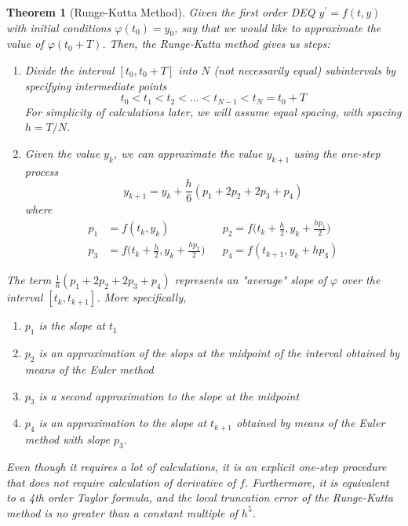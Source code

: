 \documentclass{article}
\newtheorem{theorem}{Theorem}[section]
\theoremstyle{remark}
\theoremstyle{definition}
\begin{document}
\begin{theorem}[Runge-Kutta Method]
Given the first order DEQ $y^\prime = f(t, y)$ with initial conditions $\varphi(t_0) = y_0$, say that we would like to approximate the value of $\varphi(t_0 + T)$. Then, the \textit{Runge-Kutta method} gives us steps: 
\begin{enumerate}
    \item Divide the interval $[t_0, t_0 + T]$ into $N$ (not necessarily equal) subintervals by specifying intermediate points 
    \[t_0 < t_1 < t_2 < \ldots < t_{N-1} < t_N = t_0 + T\]
    For simplicity of calculations later, we will assume equal spacing, with spacing $h = T/N$. 
    \item Given the value $y_k$, we can approximate the value $y_{k+1}$ using the one-step process
    \[y_{k+1} = y_k + \frac{h}{6} (p_1 + 2p_2 + 2p_3 + p_4)\]
    where 
    \begin{align*}
        p_1 & = f(t_k, y_k) & & p_2 = f\bigg( t_k + \frac{h}{2}, y_k + \frac{h p_1}{2}\bigg)  \\
        p_3 & = f\bigg( t_k + \frac{h}{2} , y_k + \frac{h p_2}{2} \bigg) & & p_4 = f(t_{k+1}, y_k + h p_3)
    \end{align*}
\end{enumerate}
The term $\frac{1}{6} (p_1 + 2p_2 + 2p_3 + p_4)$ represents an "average" slope of $\varphi$ over the interval $[t_k, t_{k+1}]$. More specifically, 
\begin{enumerate}
    \item $p_1$ is the slope at $t_1$
    \item $p_2$ is an approximation of the slops at the midpoint of the interval obtained by means of the Euler method
    \item $p_3$ is a second approximation to the slope at the midpoint
    \item $p_4$ is an approximation to the slope at $t_{k+1}$ obtained by means of the Euler method with slope $p_3$. 
\end{enumerate}
Even though it requires a lot of calculations, it is an explicit one-step procedure that does not require calculation of derivative of $f$. Furthermore, it is equivalent to a 4th order Taylor formula, and the local truncation error of the Runge-Kutta method is no greater than a constant multiple of $h^5$. 
\end{theorem}
\end{document}
